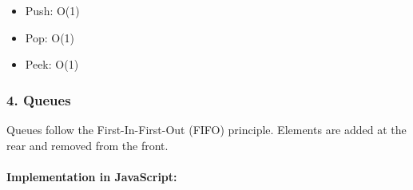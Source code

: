 \begin{itemize}
\tightlist
\item
  Push: O(1)
\item
  Pop: O(1)
\item
  Peek: O(1)
\end{itemize}

\hypertarget{queues}{%
\subsubsection{4. Queues}\label{queues}}

Queues follow the First-In-First-Out (FIFO) principle. Elements are
added at the rear and removed from the front.

\hypertarget{implementation-in-javascript}{%
\paragraph{Implementation in
JavaScript:}\label{implementation-in-javascript}}

